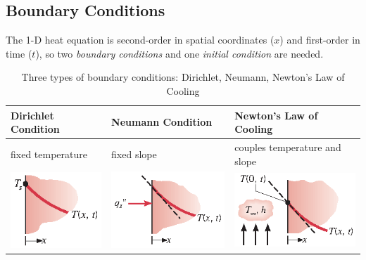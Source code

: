 \documentclass[12pt, a4paper]{article}
\begin{document}
\subsection{Boundary Conditions}
The 1-D heat equation is second-order in spatial coordinates ($x$) and first-order in time ($t$), so two \textit{boundary conditions} and one \textit{initial condition} are needed.
\begin{table}[H]
    \centering
    \begin{tabularx}{\textwidth}{>{\centering\arraybackslash}X|>{\centering\arraybackslash}X|>{\centering\arraybackslash}X}
    \toprule
        \textbf{Dirichlet Condition} & \textbf{Neumann Condition} & \textbf{Newton's Law of Cooling}  \\
    \midrule
        fixed temperature & fixed slope & couples temperature and slope \\
    \centering
    \includegraphics[]{img/Dirichlet.eps} &
    \centering
    \includegraphics[]{img/Neumann.eps} &
    {\centering
    \includegraphics[]{img/Newtons_law_of_cooling.eps}}\\
    \bottomrule
    \end{tabularx}
    \caption{Three types of boundary conditions: Dirichlet, Neumann, Newton's Law of Cooling}
    \label{tab:my_label}
\end{table}
\end{document}
